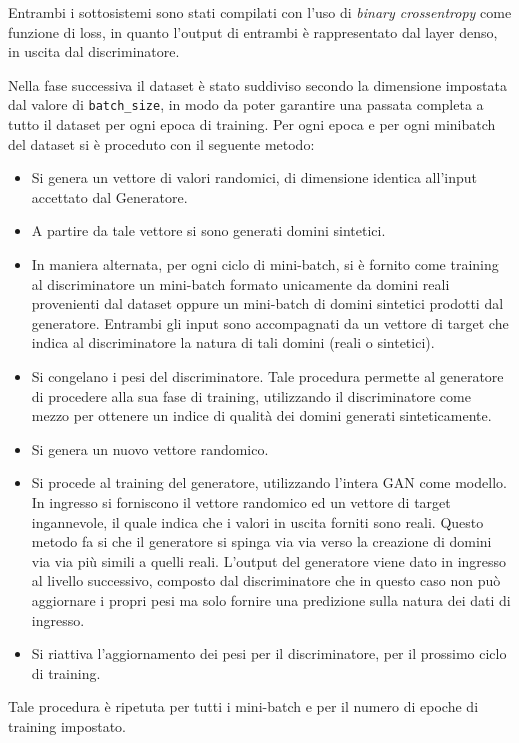 Entrambi i sottosistemi sono stati compilati con l'uso di \textit{binary crossentropy} come funzione di loss, in quanto l'output di entrambi è rappresentato dal layer denso, in uscita dal discriminatore.

Nella fase successiva il dataset è stato suddiviso secondo la dimensione impostata dal valore di \lstinline!batch_size!, in modo da poter garantire una passata completa a tutto il dataset per ogni epoca di training.
Per ogni epoca e per ogni minibatch del dataset si è proceduto con il seguente metodo: 
\begin{itemize}
	\item Si genera un vettore di valori randomici, di dimensione identica all'input accettato dal Generatore. 
	\item A partire da tale vettore si sono generati domini sintetici.
	\item In maniera alternata, per ogni ciclo di mini-batch, si è fornito come training al discriminatore un mini-batch formato unicamente da domini reali provenienti dal dataset oppure un mini-batch di domini sintetici prodotti dal generatore. Entrambi gli input sono accompagnati da un vettore di target che indica al discriminatore la natura di tali domini (reali o sintetici).
	\item Si congelano i pesi del discriminatore. Tale procedura permette al generatore di procedere alla sua fase di training, utilizzando il discriminatore come mezzo per ottenere un indice di qualità dei domini generati sinteticamente.
	\item Si genera un nuovo vettore randomico.
	\item Si procede al training del generatore, utilizzando l'intera GAN come modello. In ingresso si forniscono il vettore randomico ed un vettore di target ingannevole, il quale indica che i valori in uscita forniti sono reali. Questo metodo fa si che il generatore si spinga via via verso la creazione di domini via via più simili a quelli reali. L'output del generatore viene dato in ingresso al livello successivo, composto dal discriminatore che in questo caso non può aggiornare i propri pesi ma solo fornire una predizione sulla natura dei dati di ingresso. 
	\item Si riattiva l'aggiornamento dei pesi per il discriminatore, per il prossimo ciclo di training.
\end{itemize}

Tale procedura è ripetuta per tutti i mini-batch e per il numero di epoche di training impostato. 